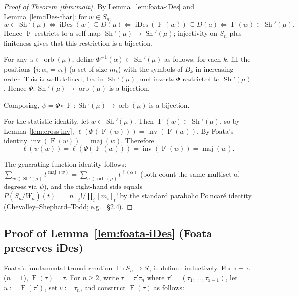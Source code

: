 \documentclass[11pt]{article}
\theoremstyle{definition}
\DeclareMathOperator{\Sh}{Sh}
\DeclareMathOperator{\orb}{orb}
\DeclareMathOperator{\inv}{inv}
\DeclareMathOperator{\maj}{maj}
\DeclareMathOperator{\iDes}{iDes}
\newcommand{\Foata}{\operatorname{F}}
\newcommand{\Phimap}{\Phi}
\begin{document}
\begin{proof}[Proof of Theorem~\ref{thm:main}]
By Lemma~\ref{lem:foata-iDes} and Lemma~\ref{lem:iDes-char}: for
$w \in S_n$,
\[
    w \in \Sh'(\mu) \iff \iDes(w) \subseteq D(\mu) \iff \iDes(\Foata(w)) \subseteq D(\mu)
    \iff \Foata(w) \in \Sh'(\mu).
\]
Hence $\Foata$ restricts to a self-map $\Sh'(\mu) \to \Sh'(\mu)$; injectivity
on $S_n$ plus finiteness gives that this restriction is a bijection.

For any $\alpha \in \orb(\mu)$, define $\Phimap^{-1}(\alpha) \in \Sh'(\mu)$ as
follows: for each $k$, fill the positions $\{i : \alpha_i = v_k\}$ (a set of
size $m_k$) with the symbols of $B_k$ in increasing order.  This is
well-defined, lies in $\Sh'(\mu)$, and inverts $\Phimap$ restricted to
$\Sh'(\mu)$.  Hence $\Phimap : \Sh'(\mu) \to \orb(\mu)$ is a bijection.

Composing, $\psi = \Phimap \circ \Foata : \Sh'(\mu) \to \orb(\mu)$ is a
bijection.

For the statistic identity, let $w \in \Sh'(\mu)$.  Then $\Foata(w) \in
\Sh'(\mu)$, so by Lemma~\ref{lem:cross-inv},
$\ell(\Phimap(\Foata(w))) = \inv(\Foata(w))$.  By Foata's identity
$\inv(\Foata(w)) = \maj(w)$.  Therefore
\[
    \ell(\psi(w)) = \ell(\Phimap(\Foata(w))) = \inv(\Foata(w)) = \maj(w).
\]

The generating function identity follows: $\sum_{w \in \Sh'(\mu)} t^{\maj(w)}
= \sum_{\alpha \in \orb(\mu)} t^{\ell(\alpha)}$ (both count the same
multiset of degrees via $\psi$), and the right-hand side equals
$P(S_n/W_\mu)(t) = [n]_t!/\prod_i[m_i]_t!$ by the standard parabolic
Poincar\'e identity (Chevalley--Shephard--Todd; e.g. \cite{BB}~\S 2.4).
\end{proof}

\subsection{Proof of Lemma~\ref{lem:foata-iDes} (Foata preserves iDes)}

Foata's fundamental transformation $\Foata : S_n \to S_n$ is defined
inductively.  For $\tau = \tau_1$ ($n=1$), $\Foata(\tau) = \tau$.  For $n \ge 2$,
write $\tau = \tau' \tau_n$ where $\tau' = (\tau_1, \ldots, \tau_{n-1})$, let
$u := \Foata(\tau')$, set $v := \tau_n$, and construct $\Foata(\tau)$ as
follows:
\end{document}
